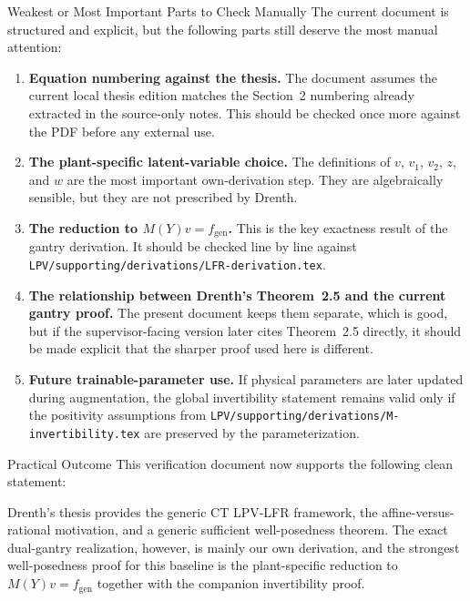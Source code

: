 ﻿\documentclass[11pt]{article}
\begin{document}
\begin{warningbox}{Weakest or Most Important Parts to Check Manually}
The current document is structured and explicit, but the following parts still
deserve the most manual attention:
\begin{enumerate}[leftmargin=1.4em,label=\arabic*.]
    \item \textbf{Equation numbering against the thesis.} The document assumes
    the current local thesis edition matches the Section~2 numbering already
    extracted in the source-only notes. This should be checked once more against
    the PDF before any external use.
    \item \textbf{The plant-specific latent-variable choice.} The definitions of
    $v$, $v_1$, $v_2$, $z$, and $w$ are the most important own-derivation step.
    They are algebraically sensible, but they are not prescribed by Drenth.
    \item \textbf{The reduction to $M(Y)v = f_{\mathrm{gen}}$.} This is the key
    exactness result of the gantry derivation. It should be checked line by line
against \texttt{LPV/supporting/derivations/LFR-derivation.tex}.
    \item \textbf{The relationship between Drenth's Theorem~2.5 and the current
    gantry proof.} The present document keeps them separate, which is good, but
    if the supervisor-facing version later cites Theorem~2.5 directly, it should
    be made explicit that the sharper proof used here is different.
    \item \textbf{Future trainable-parameter use.} If physical parameters are
    later updated during augmentation, the global invertibility statement remains
valid only if the positivity assumptions from \texttt{LPV/supporting/derivations/M-invertibility.tex}
    are preserved by the parameterization.
\end{enumerate}
\end{warningbox}

\begin{resultbox}{Practical Outcome}
This verification document now supports the following clean statement:

Drenth's thesis provides the generic CT LPV-LFR framework, the affine-versus-rational
motivation, and a generic sufficient well-posedness theorem. The exact
dual-gantry realization, however, is mainly our own derivation, and the
strongest well-posedness proof for this baseline is the plant-specific reduction
to $M(Y)v = f_{\mathrm{gen}}$ together with the companion invertibility proof.
\end{resultbox}
\end{document}
